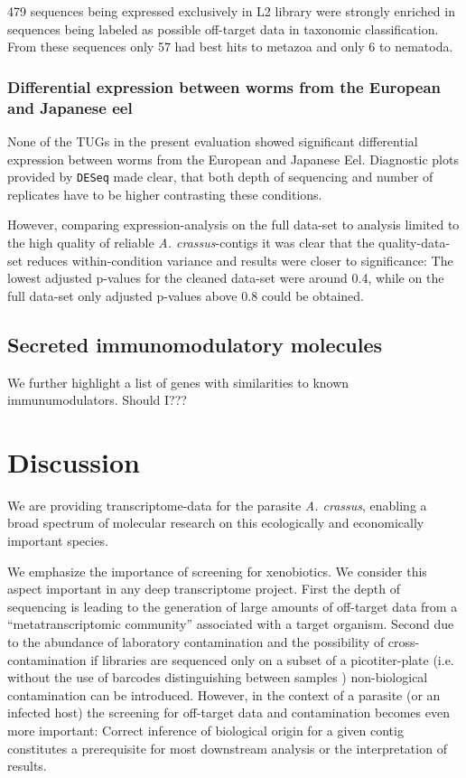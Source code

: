 \documentclass[10pt]{bmc_article}
\newenvironment{bmcformat}{\begin{raggedright}\baselineskip20pt\sloppy\setboolean{publ}{false}}{\end{raggedright}\baselineskip20pt\sloppy}
\begin{document}
\begin{bmcformat}
479 sequences being expressed exclusively
in L2 library were strongly enriched in sequences being labeled as
possible off-target data in taxonomic classification. From these
sequences only 57 had best hits to metazoa and only
6 to nematoda.

\subsubsection*{Differential expression between worms from the European
  and Japanese eel}

None of the TUGs in the present evaluation showed significant
differential expression between worms from the European and Japanese
Eel. Diagnostic plots provided by \texttt{DESeq} made clear, that both
depth of sequencing and number of replicates have to be higher
contrasting these conditions.

However, comparing expression-analysis on the full data-set to analysis
limited to the high quality of reliable \textit{A. crassus}-contigs it
was clear that the quality-data-set reduces within-condition variance
and results were closer to significance: The lowest adjusted p-values
for the cleaned data-set were around 0.4, while on the full data-set
only adjusted p-values above 0.8 could be obtained.

\subsection*{Secreted immunomodulatory molecules}

We further highlight a list of genes with similarities to known
immunumodulators. Should I???


\section*{Discussion}

We are providing transcriptome-data for the parasite
\textit{A. crassus}, enabling a broad spectrum of molecular research
on this ecologically and economically important species.

We emphasize the importance of screening for xenobiotics. We consider
this aspect important in any deep transcriptome project. First the
depth of sequencing is leading to the generation of large amounts of
off-target data from a ``metatranscriptomic community'' associated with a
target organism. Second due to the abundance of laboratory
contamination and the possibility of cross-contamination if libraries
are sequenced only on a subset of a picotiter-plate (i.e. without the
use of barcodes distinguishing between samples \cite{pmid20137071})
non-biological contamination can be introduced. 
However, in the context of a parasite (or an infected host) the
screening for off-target data and contamination becomes even more
important: Correct inference of biological origin for a given contig
constitutes a prerequisite for most downstream analysis or the
interpretation of results.


\end{bmcformat}
\end{document}
